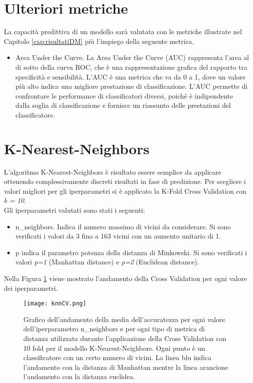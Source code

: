 \section{Ulteriori metriche}
La capacità predittiva di un modello sarà valutata con le metriche illustrate nel Capitolo \ref{cap:risultatiDM} più l'impiego della seguente metrica.
\begin{itemize}
	
	\item \textsf{Area Under the Curve}. La Area Under the Curve (AUC) rappresenta l'area al di sotto della curva ROC, che è una rappresentazione grafica del rapporto tra specificità e sensibilità.
	L'AUC è una metrica che va da 0 a 1, dove un valore più alto indica una migliore prestazione di classificazione. L'AUC permette di confrontare le performance di classificatori diversi, poiché è indipendente dalla soglia di classificazione e fornisce un riassunto delle prestazioni del classificatore.
\end{itemize}

\section{K-Nearest-Neighbors}
L'algoritmo K-Nearest-Neighbors è risultato essere semplice da applicare ottenendo complessivamente discreti risultati in fase di predizione. Per scegliere i valori migliori per gli iperparametri si è applicato la K-Fold Cross Validation con \emph{k = 10}.\\
Gli iperparametri valutati sono stati i seguenti:
\begin{itemize}
	\item \textsf{n\_neighbors}. Indica il numero massimo di vicini da considerare. Si sono verificati i valori da 3 fino a 163 vicini con un aumento unitario di 1.
	\item \textsf{p} indica il parametro potenza della distanza di Minkowski. Si sono verificati i valori \emph{p=1} (Manhattan distance) e \emph{p=2} (Euclidean distance).
\end{itemize}

Nella Figura \ref{fig:knnCV} viene mostrato l'andamento della Cross Validation per ogni valore dei iperparametri.
\begin{figure}[h]
	\begin{center}
		\texttt{[image: knnCV.png]}
		\caption{Grafico dell'andamento della media dell'accuratezza per ogni valore dell'iperparametro \textsf{n\_neighbors} e per ogni tipo di metrica di distanza utilizzata durante l'applicazione della Cross Validation con 10 fold per il modello K-Nearest-Neighbors. Ogni punto è un classificatore con un certo numero di vicini. La linea blu indica l'andamento con la distanza di Manhattan mentre la linea arancione l'andamento con la distanza euclidea.
		} 
		\label{fig:knnCV}
	\end{center}
\end{figure}

